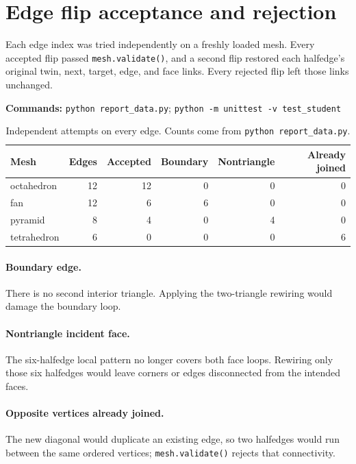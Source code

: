 \documentclass[11pt,a4paper]{article}
\newcommand{\code}[1]{\texttt{#1}}
\begin{document}
\section{Edge flip acceptance and rejection}
Each edge index was tried independently on a freshly loaded mesh. Every
accepted flip passed \code{mesh.validate()}, and a second flip restored each
halfedge's original twin, next, target, edge, and face links. Every rejected
flip left those links unchanged.

\textbf{Commands:} \code{python report\_data.py};
\code{python -m unittest -v test\_student}

\begin{table}[ht]
\centering
\caption{Independent attempts on every edge. Counts come from
  \code{python report\_data.py}.}
\vspace{3pt}
\small
\begin{tabular}{lrrrrr}
\toprule
Mesh & Edges & Accepted & Boundary & Nontriangle & Already joined \\
\midrule
octahedron & 12 & 12 & 0 & 0 & 0 \\
fan & 12 & 6 & 6 & 0 & 0 \\
pyramid & 8 & 4 & 0 & 4 & 0 \\
tetrahedron & 6 & 0 & 0 & 0 & 6 \\
\bottomrule
\end{tabular}
\end{table}

\paragraph{Boundary edge.} There is no second interior triangle. Applying the
two-triangle rewiring would damage the boundary loop.

\paragraph{Nontriangle incident face.} The six-halfedge local pattern no longer
covers both face loops. Rewiring only those six halfedges would leave corners
or edges disconnected from the intended faces.

\paragraph{Opposite vertices already joined.} The new diagonal would duplicate
an existing edge, so two halfedges would run between the same ordered
vertices; \code{mesh.validate()} rejects that connectivity.
\end{document}
